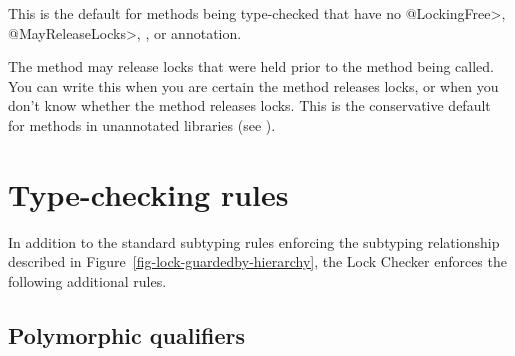 \begin{sloppypar}
\begin{description}
  This is the default for methods being type-checked that have no \<@LockingFree>,
  \<@MayReleaseLocks>, , or 
  annotation.

\item[\refqualclass{checker/lock/qual}{MayReleaseLocks}]
  The method may release locks that were held prior to the method being called.
  You can write this when you are certain the method releases locks, or
  when you don't know whether the method releases locks.
  This is the conservative default for methods in unannotated libraries (see ).

\end{description}
\end{sloppypar}


\section{Type-checking rules\label{lock-type-checking-rules}}

In addition to the standard subtyping rules enforcing the subtyping relationship
described in Figure~\ref{fig-lock-guardedby-hierarchy}, the Lock Checker enforces
the following additional rules.


\subsection{Polymorphic qualifiers\label{lock-type-checking-rules-polymorphic-qualifiers}}

